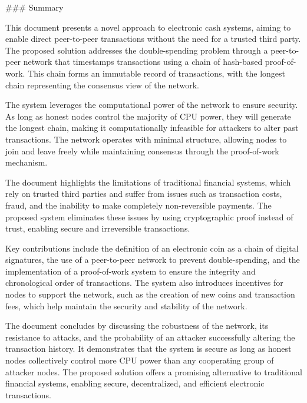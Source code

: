 ### Summary

This document presents a novel approach to electronic cash systems, aiming to enable direct peer-to-peer transactions without the need for a trusted third party. The proposed solution addresses the double-spending problem through a peer-to-peer network that timestamps transactions using a chain of hash-based proof-of-work. This chain forms an immutable record of transactions, with the longest chain representing the consensus view of the network.

The system leverages the computational power of the network to ensure security. As long as honest nodes control the majority of CPU power, they will generate the longest chain, making it computationally infeasible for attackers to alter past transactions. The network operates with minimal structure, allowing nodes to join and leave freely while maintaining consensus through the proof-of-work mechanism.

The document highlights the limitations of traditional financial systems, which rely on trusted third parties and suffer from issues such as transaction costs, fraud, and the inability to make completely non-reversible payments. The proposed system eliminates these issues by using cryptographic proof instead of trust, enabling secure and irreversible transactions.

Key contributions include the definition of an electronic coin as a chain of digital signatures, the use of a peer-to-peer network to prevent double-spending, and the implementation of a proof-of-work system to ensure the integrity and chronological order of transactions. The system also introduces incentives for nodes to support the network, such as the creation of new coins and transaction fees, which help maintain the security and stability of the network.

The document concludes by discussing the robustness of the network, its resistance to attacks, and the probability of an attacker successfully altering the transaction history. It demonstrates that the system is secure as long as honest nodes collectively control more CPU power than any cooperating group of attacker nodes. The proposed solution offers a promising alternative to traditional financial systems, enabling secure, decentralized, and efficient electronic transactions.